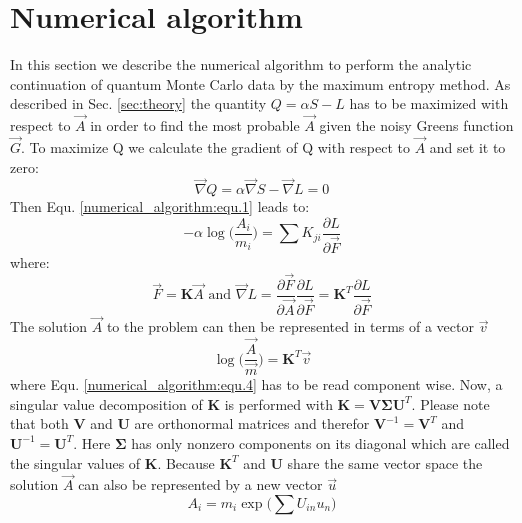 \documentclass[10pt,letterpaper]{article}
\begin{document}
\section{Numerical algorithm} %
\label{sec:numerical_algorithm}
In this section we describe the numerical algorithm to perform the analytic continuation of quantum Monte Carlo data by the maximum entropy method. As described in Sec. \ref{sec:theory} the quantity $Q = \alpha S - L$ has to be maximized with respect to $\vec A$ in order to find the most probable $\vec A$ given the noisy Greens function $\vec G$. To maximize Q we calculate the gradient of Q with respect to $\vec A$ and set it to zero:
\begin{equation}
	\vec\nabla Q =  \alpha \vec\nabla S - \vec\nabla L = 0
	\label{numerical_algorithm:equ.1}
\end{equation}
Then Equ. \ref{numerical_algorithm:equ.1} leads to:
\begin{equation}
	- \alpha \log \bigg(\frac{A_i}{m_i} \bigg) = \sum K_{ji} \frac{\partial L}{\partial \vec F}
	\label{numerical_algorithm:equ.2}
\end{equation}
where:
\begin{equation}
	\vec F = \mathbf{K} \vec A \text{ and } \vec \nabla L = \frac{\partial \vec F}{\partial \vec A} \frac{\partial L}{\partial \vec F} = \mathbf{K}^T \frac{\partial L}{\partial \vec F}
	\label{numerical_algorithm:equ.3}
\end{equation}
The solution $\vec A$ to the problem can then be represented in terms of a vector $\vec v$
\begin{equation}
	\log \bigg(\frac{\vec A}{\vec m}\bigg) = \mathbf{K}^T \vec v
	\label{numerical_algorithm:equ.4}
\end{equation}
where Equ. \ref{numerical_algorithm:equ.4} has to be read component wise.
Now, a singular value decomposition of $\mathbf{K}$ is performed with $\mathbf{K} = \mathbf{V} \mathbf{\Sigma} \mathbf{U}^T$. Please note that both $\mathbf{V}$ and $\mathbf{U}$ are orthonormal matrices and therefor $\mathbf{V}^{-1}=\mathbf{V}^T$ and $\mathbf{U}^{-1}=\mathbf{U}^T$.
Here $\mathbf{\Sigma}$ has only nonzero components on its diagonal which are called the singular values of $\mathbf{K}$. Because $\mathbf{K}^T$ and $\mathbf{U}$ share the same vector space the solution $\vec A$ can also be represented by a new vector $\vec u$
\begin{equation}
	A_i = m_i \exp \Big(\sum U_{in}u_n\Big)
	\label{numerical_algorithm:equ.5}
\end{equation}
\end{document}
